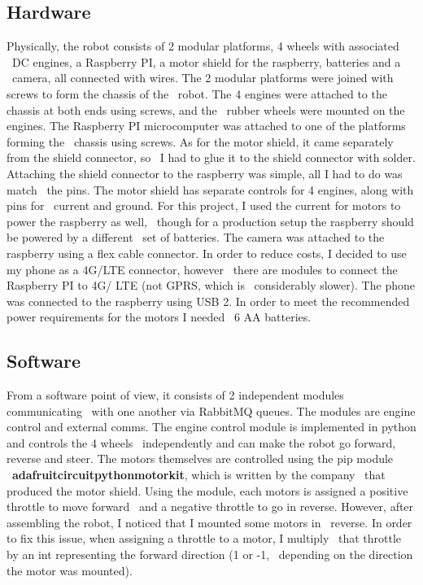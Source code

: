 \subsection{Hardware}
\label{subsec:implementation-robot-hardware}

Physically, the robot consists of 2 modular platforms, 4 wheels with associated \
DC engines, a Raspberry PI, a motor shield for the raspberry, batteries and a \
camera, all connected with wires.
The 2 modular platforms were joined with screws to form the chassis of the \
robot.
The 4 engines were attached to the chassis at both ends using screws, and the \
rubber wheels were mounted on the engines.
The Raspberry PI microcomputer was attached to one of the platforms forming the \
chassis using screws.
As for the motor shield, it came separately from the shield connector, so \
I had to glue it to the shield connector with solder.
Attaching the shield connector to the raspberry was simple, all I had to do was match \
the pins.
The motor shield has separate controls for 4 engines, along with pins for \
current and ground.
For this project, I used the current for motors to power the raspberry as well, \
though for a production setup the raspberry should be powered by a different \
set of batteries.
The camera was attached to the raspberry using a flex cable connector.
In order to reduce costs, I decided to use my phone as a 4G/LTE connector, however \
there are modules to connect the Raspberry PI to 4G/ LTE (not GPRS, which is \
considerably slower).
The phone was connected to the raspberry using USB 2.
In order to meet the recommended power requirements for the motors I needed \
6 AA batteries.


\subsection{Software}
\label{subsec:implementation-robot-software}

From a software point of view, it consists of 2 independent modules communicating \
with one another via RabbitMQ queues.
The modules are engine control and external comms.
The engine control module is implemented in python and controls the 4 wheels \
independently and can make the robot go forward, reverse and steer.
The motors themselves are controlled using the pip module \
\textbf{adafruit\-circuitpython\-motorkit}, which is written by the company \
that produced the motor shield.
Using the module, each motors is assigned a positive throttle to move forward \
and a negative throttle to go in reverse.
However, after assembling the robot, I noticed that I mounted some motors in \
reverse.
In order to fix this issue, when assigning a throttle to a motor, I multiply \
that throttle by an int representing the forward direction (1 or -1, \
depending on the direction the motor was mounted).


